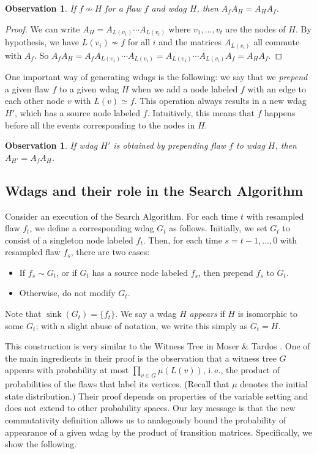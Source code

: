\documentclass[11pt]{article}
\newcommand{\ie}{i.\,e.}
\DeclareMathOperator{\sink}{sink}
\newtheorem{observation}[theorem]{Observation}
\begin{document}
\begin{observation}
\label{ah-prop2}
If $f \not \sim H$ for a flaw $f$ and wdag $H$, then $A_f A_H = A_H A_f$.
\end{observation}
\begin{proof}
We can write $A_H = A_{L(v_1)} \cdots A_{L(v_t)}$ where $v_1, \dots, v_t$ are the nodes of $H$. By hypothesis, we have $L(v_i) \not \sim f$ for all $i$ and the matrices $A_{L(v_i)}$ all commute with $A_f$. So $A_f A_H = A_f  A_{L(v_1)} \cdots A_{L(v_t)} = A_{L(v_1)} \cdots A_{L(v_t)} A_f  = A_H A_f.$
\end{proof}


 One important way of generating wdags is the following: we say that we   \emph{prepend} a given flaw $f$ to a given wdag $H$ when we add a node labeled $f$ with an edge to each other node $v$ with $L(v) \simeq f$.  This operation always results in a new wdag $H'$, which has a source node labeled $f$. Intuitively, this means that $f$ happens before all the events corresponding to the nodes in $H$.

\begin{observation}
If wdag $H'$ is obtained by prepending flaw $f$ to wdag $H$, then $A_{H'} = A_f A_H$.
\end{observation}

\subsection{Wdags and their role in the Search Algorithm}
\label{wdag-construct}
Consider an execution of the Search Algorithm. For each time $t$ with resampled flaw $f_t$, we define a corresponding wdag $G_{t}$  %
as follows. %
%
Initially,  %
we set $G_t$ to consist of a singleton node labeled $f_t$. Then, for each time $s = t-1, \ldots, 0$ with resampled flaw $f_s$, there are two cases:
\begin{itemize}
\item If $f_s \sim G_t$, or if $G_t$ has a source node labeled $f_s$,  then prepend $f_s$ to $G_t$.
\item Otherwise, do not modify $G_t$.
 \end{itemize}
 
Note that $\sink(G_t) = \{f_t \}$.  We say a wdag $H$ \emph{appears} if $H$ is isomorphic to some $G_t$; with a slight abuse of notation, we write this simply as $G_t = H$.  
 
  This construction is very similar to the Witness Tree in Moser \& Tardos \cite{MT}.  One of the main ingredients in their proof is the observation that a witness tree $G$ appears with probability at most $\prod_{v \in G } \mu(L(v) ) $, \ie,  the product of probabilities of the flaws that label its vertices.  (Recall  that $\mu$ denotes the initial state distribution.) Their proof depends on properties of the variable setting and does not extend to other probability spaces.  Our key message is that the new commutativity definition allows us to analogously bound the probability of appearance of a given wdag by the product of transition matrices. Specifically, we show the following. 
  
\end{document}
